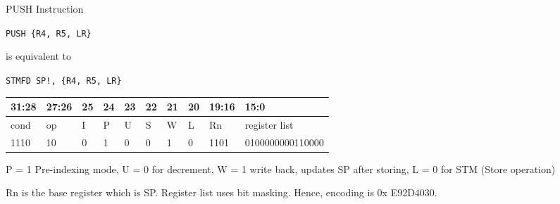 \documentclass[aspectratio=169]{beamer}
\begin{document}
\begin{frame}
    \sectionpage
\end{frame}

\begin{frame}{PUSH Instruction}

        \begin{tcolorbox}[
            enhanced,
            colback=androidBlueLight,
            colframe=androidBlue,
            arc=5pt,
            boxrule=1pt,
            title=\textbf{},
            fonttitle=\bfseries,
            coltitle=black,
            top=10pt,
            bottom=8pt,
            left=8pt,
            right=8pt,
            attach boxed title to top left={xshift=10pt, yshift=-\tcboxedtitleheight/2},
            boxed title style={
                colback=androidBlue,    
                colframe=androidBlue,
                arc=3pt,
                boxrule=0pt,
                left=6pt, right=6pt,
                top=3pt, bottom=3pt
            }
            ]
            
            
            \texttt{PUSH \{R4, R5, LR\} }
    
            \vspace{0.5em}
    
            is equivalent to 
    
            \vspace{0.5em}
    
            \texttt{STMFD SP!,  \{R4, R5, LR\} }
    
        \end{tcolorbox}

        \footnotesize
        \renewcommand{\arraystretch}{1.2}
        \begin{tabular}{|p{3.0em}|p{3.0em}|p{1.5em}|p{1.5em}|p{1.5em}|p{1.5em}|p{1.5em}|p{1.5em}|p{3.0em}|p{10.0em}|}
        \hline
        31:28 & 27:26 & 25 & 24 & 23 & 22 & 21 & 20 & 19:16 & 15:0\\
        \hline
        cond & op & I & P & U & S & W & L & Rn & register list\\
        \hline
        1110 & 10 & 0 & 1 & 0 & 0 & 1 & 0 & 1101 & 0100000000110000 \\
        \hline
        \end{tabular}

        \vspace{0.5em}
    

        P = 1 Pre-indexing mode, U = 0 for decrement, W = 1 write back, updates SP after storing, L = 0 for STM (Store operation)

        Rn is the base register which is SP. Register list uses bit masking. Hence, encoding is 0x E92D4030.

        
\end{frame}
\end{document}

